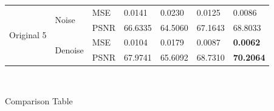 \begin{center}
\begin{tabular}{llllllllllll|l|l|l|l|l|l|l|l|l|l|l|l|l|}
\multicolumn{4}{|l|}{\multirow{4}{*}{Original 5}} & \multicolumn{4}{l|}{\multirow{2}{*}{Noise}}   & \multicolumn{4}{l|}{MSE}  & \multicolumn{3}{l|}{0.0141}  & \multicolumn{3}{l|}{0.0230}  & \multicolumn{4}{l|}{0.0125}   & \multicolumn{3}{l|}{0.0086}           \\ \cline{9-25} 
\multicolumn{4}{|l|}{}                            & \multicolumn{4}{l|}{}                         & \multicolumn{4}{l|}{PSNR} & \multicolumn{3}{l|}{66.6335} & \multicolumn{3}{l|}{64.5060} & \multicolumn{4}{l|}{67.1643}  & \multicolumn{3}{l|}{68.8033}          \\ \cline{5-25} 
\multicolumn{4}{|l|}{}                            & \multicolumn{4}{l|}{\multirow{2}{*}{Denoise}} & \multicolumn{4}{l|}{MSE}  & \multicolumn{3}{l|}{0.0104}  & \multicolumn{3}{l|}{0.0179}  & \multicolumn{4}{l|}{0.0087}   & \multicolumn{3}{l|}{\textbf{0.0062}}  \\ \cline{9-25} 
\multicolumn{4}{|l|}{}                            & \multicolumn{4}{l|}{}                         & \multicolumn{4}{l|}{PSNR} & \multicolumn{3}{l|}{67.9741} & \multicolumn{3}{l|}{65.6092} & \multicolumn{4}{l|}{68.7310}  & \multicolumn{3}{l|}{\textbf{70.2064}} \\ \hline
\end{tabular}

\

Comparison Table
\end{center}



\newpage
